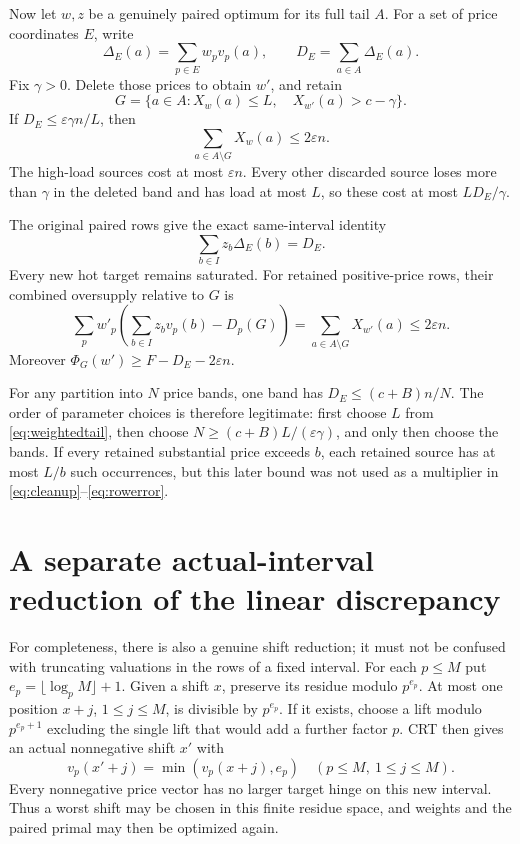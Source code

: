 \documentclass[11pt,a4paper]{article}
\begin{document}
Now let $w,z$ be a genuinely paired optimum for its full tail $A$.
For a set of price coordinates $E$, write
\[
 \Delta_E(a)=\sum_{p\in E}w_pv_p(a),\qquad
 D_E=\sum_{a\in A}\Delta_E(a).
\]
Fix $\gamma>0$. Delete those prices to obtain $w'$, and retain
\[
 G=\{a\in A:X_w(a)\le L,\quad X_{w'}(a)>c-\gamma\}.
\]
If $D_E\le\varepsilon\gamma n/L$, then
\begin{equation}
 \sum_{a\in A\setminus G}X_w(a)\le2\varepsilon n.      \label{eq:cleanup}
\end{equation}
The high-load sources cost at most $\varepsilon n$. Every other
discarded source loses more than $\gamma$ in the deleted band and has
load at most $L$, so these cost at most $LD_E/\gamma$.

The original paired rows give the exact same-interval identity
\[
 \sum_{b\in I}z_b\Delta_E(b)=D_E.
\]
Every new hot target remains saturated. For retained positive-price
rows, their combined oversupply relative to $G$ is
\begin{equation}
 \sum_p w'_p\left(\sum_{b\in I}z_bv_p(b)-D_p(G)\right)
 =\sum_{a\in A\setminus G}X_{w'}(a)\le2\varepsilon n.  \label{eq:rowerror}
\end{equation}
Moreover $\Phi_G(w')\ge F-D_E-2\varepsilon n$.

For any partition into $N$ price bands, one band has
$D_E\le(c+B)n/N$. The order of parameter choices is therefore
legitimate: first choose $L$ from \eqref{eq:weightedtail}, then choose
$N\ge(c+B)L/(\varepsilon\gamma)$, and only then choose the bands.
If every retained substantial price exceeds $b$, each retained source
has at most $L/b$ such occurrences, but this later bound was not used
as a multiplier in \eqref{eq:cleanup}--\eqref{eq:rowerror}.

\section{A separate actual-interval reduction of the linear discrepancy}

For completeness, there is also a genuine shift reduction; it must not
be confused with truncating valuations in the rows of a fixed interval.
For each $p\le M$ put $e_p=\lfloor\log_p M\rfloor+1$. Given a shift
$x$, preserve its residue modulo $p^{e_p}$. At most one position
$x+j$, $1\le j\le M$, is divisible by $p^{e_p}$. If it exists, choose
a lift modulo $p^{e_p+1}$ excluding the single lift that would add a
further factor $p$. CRT then gives an actual nonnegative shift $x'$
with
\[
 v_p(x'+j)=\min(v_p(x+j),e_p)\quad(p\le M,\ 1\le j\le M).
\]
Every nonnegative price vector has no larger target hinge on this new
interval. Thus a worst shift may be chosen in this finite residue
space, and weights and the paired primal may then be optimized again.
\end{document}
